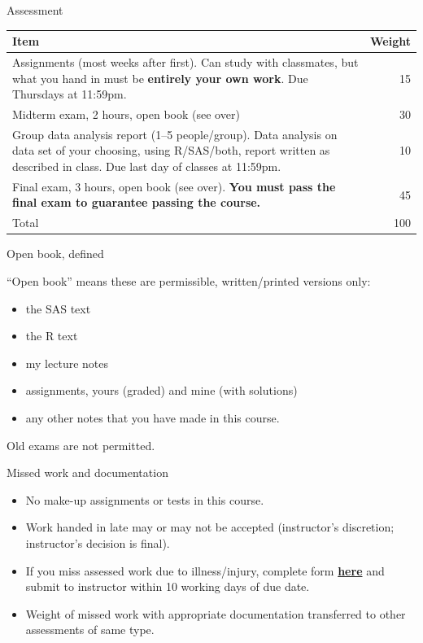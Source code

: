\documentclass[ignorenonframetext,]{beamer}
\providecommand{\tightlist}{%
  \setlength{\itemsep}{0pt}\setlength{\parskip}{0pt}}
\begin{document}
\begin{frame}{Assessment}
\protect\hypertarget{assessment}{}

\begin{tabular}{p{3.5in}r}
    \hline
    Item & Weight\\
    \hline
    Assignments (most weeks after first). Can study with classmates, but what you hand in must
    be \textbf{entirely your own work}. Due Thursdays at 11:59pm. & 15\\
    \hline
    Midterm exam, 2 hours, open book (see over) & 30\\
    \hline
    Group data analysis report (1--5 people/group). Data analysis on data set of your choosing,
    using R/SAS/both, report written as described in class.
    Due last
    day of classes at 11:59pm. & 10 \\
    \hline
    Final exam, 3 hours, open book (see over). \textbf{You must pass
    the final exam to guarantee passing the course.} & 45\\
    \hline
    Total & 100\\
    \hline
  \end{tabular}

\end{frame}

\begin{frame}{Open book, defined}
\protect\hypertarget{open-book-defined}{}

``Open book'' means these are permissible, written/printed versions
only:

\begin{itemize}
\tightlist
\item
  the SAS text
\item
  the R text
\item
  my lecture notes
\item
  assignments, yours (graded) and mine (with solutions)
\item
  any other notes that you have made in this course.
\end{itemize}

Old exams are not permitted.

\end{frame}

\begin{frame}{Missed work and documentation}
\protect\hypertarget{missed-work-and-documentation}{}

\begin{itemize}
\tightlist
\item
  No make-up assignments or tests in this course.
\item
  Work handed in late may or may not be accepted (instructor's
  discretion; instructor's decision is final).
\item
  If you miss assessed work due to illness/injury, complete form
  \href{http://www.illnessverification.utoronto.ca/}{\textbf{here}} and
  submit to instructor within 10 working days of due date.
\item
  Weight of missed work with appropriate documentation transferred to
  other assessments of same type.
\end{itemize}

\end{frame}
\end{document}
